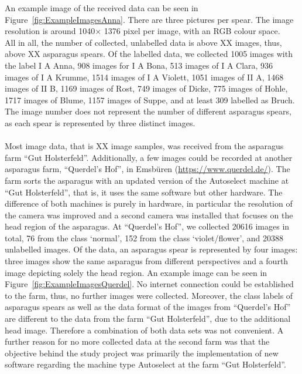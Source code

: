 An example image of the received data can be seen in Figure~\ref{fig:ExampleImagesAnna}. There are three pictures per spear. The image resolution is around 1040$\times$ 1376 pixel per image, with an RGB colour space. \\
All in all, the number of collected, unlabelled data is above XX images, thus, above XX asparagus spears. Of the labelled data, we collected 1005 images with the label I A Anna,  908 images for I A Bona, 513 images of I A Clara, 936 images of I A Krumme, 1514 images of I A Violett, 1051 images of II A, 1468 images of II B, 1169 images of Rost, 749 images of Dicke, 775 images of Hohle, 1717 images of Blume, 1157 images of Suppe, and at least 309 labelled as Bruch. The image number does not represent the number of different asparagus spears, as each spear is represented by three distinct images. \\
\\
Most image data, that is XX image samples, was received from the asparagus farm “Gut Holsterfeld”. Additionally, a few images could be recorded at another asparagus farm, “Querdel’s Hof”, in Emsbüren (\url{https://www.querdel.de/}). The farm sorts the asparagus with an updated version of the Autoselect machine at “Gut Holsterfeld”, that is, it uses the same software but other hardware. The difference of both machines is purely in hardware, in particular the resolution of the camera was improved and a second camera was installed that focuses on the head region of the asparagus. At “Querdel’s Hof”, we collected 20616 images in total, 76 from the class ‘normal’, 152 from the class ‘violet/flower’, and 20388 unlabelled images. Of the data, an asparagus spear is represented by four images: three images show the same asparagus from different perspectives and a fourth image depicting solely the head region. An example image can be seen in Figure~\ref{fig:ExampleImagesQuerdel}. No internet connection could be established to the farm, thus, no further images were collected. Moreover, the class labels of asparagus spears as well as the data format of the images from “Querdel’s Hof” are different to the data from the farm “Gut Holsterfeld”, due to the additional head image. Therefore a combination of both data sets was not convenient. A further reason for no more collected data at the second farm was that the objective behind the study project was primarily the implementation of new software regarding the machine type Autoselect at the farm “Gut Holsterfeld”. \\

